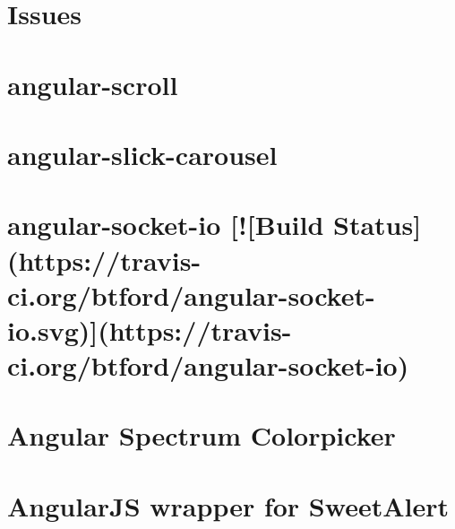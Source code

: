 \documentclass[twoside]{book}
\newcommand{\+}{\discretionary{\mbox{\scriptsize$\hookleftarrow$}}{}{}}
\begin{document}
\chapter{Issues}
\label{md_app_web_bower_components_angular-scroll__c_o_n_t_r_i_b_u_t_i_n_g}

\chapter{angular-\/scroll}
\label{md_app_web_bower_components_angular-scroll__r_e_a_d_m_e}

\chapter{angular-\/slick-\/carousel}
\label{md_app_web_bower_components_angular-slick-carousel__r_e_a_d_m_e}

\chapter{angular-\/socket-\/io \mbox{[}!\mbox{[}Build Status\mbox{]}(https\+://travis-\/ci.org/btford/angular-\/socket-\/io.svg)\mbox{]}(https\+://travis-\/ci.org/btford/angular-\/socket-\/io)}
\label{md_app_web_bower_components_angular-socket-io__r_e_a_d_m_e}

\chapter{Angular Spectrum Colorpicker}
\label{md_app_web_bower_components_angular-spectrum-colorpicker__r_e_a_d_m_e}

\chapter{Angular\+JS wrapper for Sweet\+Alert}
\label{md_app_web_bower_components_angular-sweetalert-promised__r_e_a_d_m_e}

\end{document}
